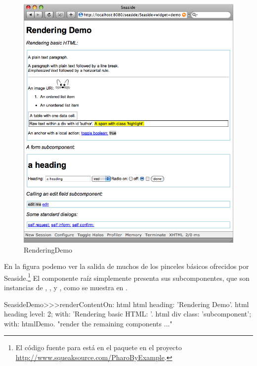 \documentclass[a4paper,10pt,twoside]{book}
\begin{document}
\begin{figure}[ht]
\begin{center}
\includegraphics[width=\textwidth]{RenderingDemo}
\caption{RenderingDemo}
\end{center}
\end{figure}

En la figura  podemo ver la salida de muchos de los pinceles básicos ofrecidos por Seaside.\footnote{El código fuente para  está en el paquete  en el proyecto \url{http://www.squeaksource.com/PharoByExample}.}
El componente raíz  simplemente presenta sus subcomponentes, que son instancias de , ,  y , como se muestra en .

\needspace{7ex}
\begin{code}[renderdemo]{}
SeasideDemo>>>renderContentOn: html
	html heading: 'Rendering Demo'.
	html heading
		level: 2;
		with: 'Rendering basic HTML: '.
	html div
		class: 'subcomponent';
		with: htmlDemo.
	"render the remaining components ..."
\end{code}
\end{document}
